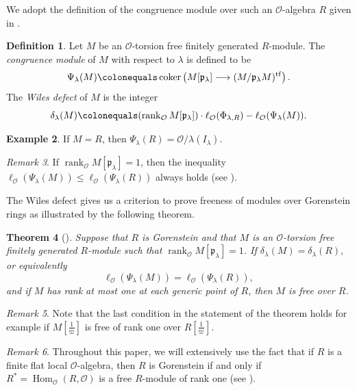 \documentclass[a4paper, notitlepage, 10pt]{amsart}
\theoremstyle{plain} %
\newtheorem{theorem}{Theorem}[section]
\theoremstyle{definition} %
\newtheorem{definition}[theorem]{Definition}
\newtheorem{example}[theorem]{Example}
\theoremstyle{remark} %
\newtheorem{remark}[theorem]{Remark}
\numberwithin{equation}{section}
\newcommand{\coker}{\operatorname{coker}} %
\newcommand{\Hom}{\operatorname{Hom}} %
\newcommand{\rank}{\operatorname{rank}} %
\newcommand{\tf}{\operatorname{tf}} %
\begin{document}
We adopt the definition of the congruence module over such an $\mathcal{O}$-algebra $R$ given in \cite{KIM}.
\begin{definition}
    Let $M$ be an $\mathcal{O}$-torsion free finitely generated $R$-module. The \emph{congruence module} of $M$ with respect to $\lambda$ is defined to be
    $$\Psi_\lambda(M)\colonequals \coker\left( M[\mathfrak{p}_\lambda]\longrightarrow (M/\mathfrak{p}_\lambda M)^{\tf}\right). $$
    The \emph{Wiles defect} of $M$ is the integer
    $$ \delta_\lambda(M)\colonequals (\rank_{\mathcal{O}}M[\mathfrak{p}_\lambda])\cdot \ell_{\mathcal{O}}(\Phi_{\lambda,R})-\ell_{\mathcal{O}}(\Psi_\lambda(M)). $$
\end{definition}
\begin{example}\label{congmoduleforR}
    If $M=R$, then $\Psi_{\lambda}(R)=\mathcal{O}/\lambda(I_{\lambda})$.
\end{example}
\begin{remark}\label{upperbound}
    If $\rank_{\mathcal{O}}M[\mathfrak{p}_\lambda]=1$, then the inequality $\ell_{\mathcal{O}}(\Psi_\lambda(M))\le \ell_{\mathcal{O}}(\Psi_\lambda(R))$ always holds (see \cite[Theorem 3.12]{BKM1}).
\end{remark}
The Wiles defect gives us a criterion to prove freeness of modules over Gorenstein rings as illustrated by the following theorem.
\begin{theorem}[{\cite[Theorem 1.2]{BIK}}]\label{freenessoverGorenstein}
    Suppose that $R$ is Gorenstein and that $M$ is an $\mathcal{O}$-torsion free finitely generated $R$-module such that $\rank_{\mathcal{O}}M[\mathfrak{p}_\lambda]=1$. If
    $ \delta_\lambda(M)= \delta_\lambda(R),$
    or equivalently $$\ell_{\mathcal{O}}(\Psi_{\lambda}(M))=\ell_{\mathcal{O}}(\Psi_{\lambda}(R)),$$ and if $M$ has rank at most one at each generic point of $R$, then $M$ is free over $R$.\end{theorem}
\begin{remark}
    Note that the last condition in the statement of the theorem holds for example if $M[\tfrac{1}{\varpi}]$ is free of rank one over $R[\tfrac{1}{\varpi}]$.
\end{remark}
\begin{remark}\label{dualofGorenstein}
    Throughout this paper, we will extensively use the fact that if $R$ is a finite flat local $\mathcal{O}$-algebra, then $R$ is Gorenstein if and only if $R^*=\Hom_{\mathcal{O}}(R,\mathcal{O})$ is a free $R$-module of rank one (see \cite[Theorem 21.15]{Eisen}).
\end{remark}
\end{document}
